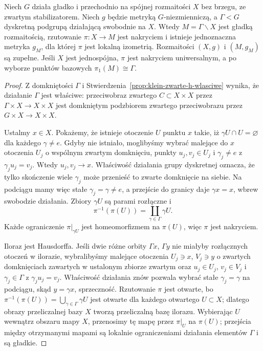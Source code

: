 \begin{twierdzenie}
\label{prop:klein-dyskretny-iloraz}
Niech $G$ działa gładko i przechodnio na spójnej
rozmaitości $X$ bez brzegu, ze zwartym stabilizatorem.
Niech $g$ będzie metryką $G$-niezmienniczą, a
$\Gamma<G$ dyskretną podgrupą działającą swobodnie na $X$.
Wtedy $M=\Gamma\backslash X$ jest gładką rozmaitością,
rzutowanie $\pi:X\to M$ jest nakryciem i istnieje
jednoznaczna metryka $g_M$, dla której $\pi$ jest lokalną
izometrią. Rozmaitości $(X,g)$ i $(M,g_M)$ są zupełne.
Jeśli $X$ jest jednospójna, $\pi$ jest nakryciem uniwersalnym,
a po wyborze punktów bazowych $\pi_1(M)\cong\Gamma$.
\end{twierdzenie}
\begin{proof}
Z domkniętości $\Gamma$ i
Stwierdzenia~\ref{prop:klein-zwarte-h-wlasciwe}
wynika, że działanie $\Gamma$ jest właściwe: przeciwobraz
zwartego $C\subset X\times X$ przez
$\Gamma\times X\to X\times X$ jest domkniętym podzbiorem
zwartego przeciwobrazu przez $G\times X\to X\times X$.

Ustalmy $x\in X$. Pokażemy, że istnieje otoczenie $U$ punktu $x$
takie, iż $\gamma U\cap U=\varnothing$ dla każdego
$\gamma\ne e$. Gdyby nie istniało, moglibyśmy wybrać
malejące do $x$ otoczenia $U_j$ o wspólnym zwartym domknięciu,
punkty $u_j,v_j\in U_j$ i $\gamma_j\ne e$ z
$\gamma_j u_j=v_j$. Wtedy $u_j,v_j\to x$.
Właściwość działania grupy dyskretnej oznacza, że tylko
skończenie wiele $\gamma_j$ może przenieść to zwarte
domknięcie na siebie. Na podciągu mamy więc stałe
$\gamma_j=\gamma\ne e$, a przejście do granicy daje
$\gamma x=x$, wbrew swobodzie działania.
Zbiory $\gamma U$ są parami rozłączne i
\[
 \pi^{-1}(\pi(U))=\coprod_{\gamma\in\Gamma}\gamma U.
\]
Każde ograniczenie $\pi|_{\gamma U}$ jest homeomorfizmem
na $\pi(U)$, więc $\pi$ jest nakryciem.

Iloraz jest Hausdorffa. Jeśli dwie różne orbity $\Gamma x$,
$\Gamma y$ nie miałyby rozłącznych otoczeń w ilorazie,
wybralibyśmy malejące otoczenia $U_j\ni x$, $V_j\ni y$
o zwartych domknięciach zawartych w ustalonym zbiorze zwartym
oraz $u_j\in U_j$, $v_j\in V_j$ i $\gamma_j\in\Gamma$
z $\gamma_j u_j=v_j$. Właściwość działania znów pozwala
wybrać stałe $\gamma_j=\gamma$ na podciągu, skąd
$y=\gamma x$, sprzeczność. Rzutowanie $\pi$ jest otwarte,
bo $\pi^{-1}(\pi(U))=\bigcup_{\gamma\in\Gamma}\gamma U$
jest otwarte dla każdego otwartego $U\subset X$; dlatego
obrazy przeliczalnej bazy $X$ tworzą przeliczalną bazę
ilorazu. Wybierając $U$ wewnątrz obszaru mapy $X$,
przenosimy tę mapę przez $\pi|_U$ na $\pi(U)$;
przejścia między otrzymanymi mapami są lokalnie ograniczeniami
działania elementów $\Gamma$ i są gładkie.


\end{proof}
